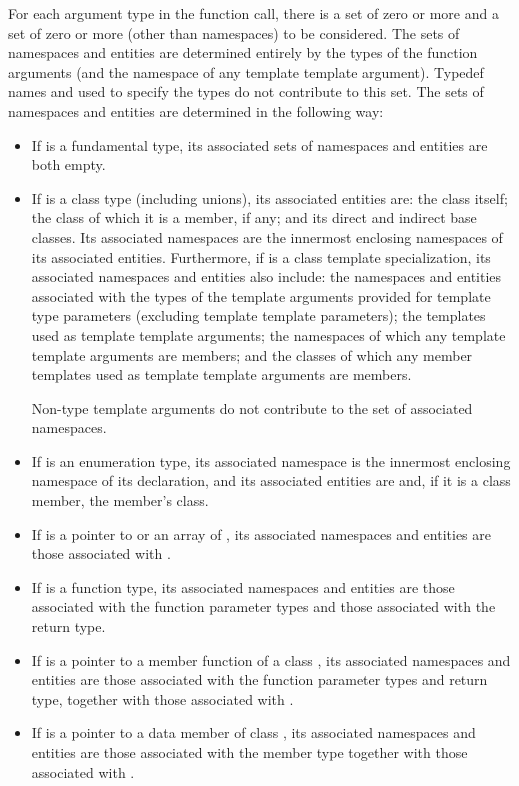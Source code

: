 \pnum
For each argument type  in the function call,
there is a set of zero or more
and a set of zero or more
(other than namespaces)
to be considered.
The sets of namespaces and entities
are determined entirely by
the types of the function arguments
(and the namespace of any template template argument).
Typedef names and 
used to specify the types
do not contribute to this set.
The sets of namespaces and entities
are determined in the following way:
\begin{itemize}
\item If  is a fundamental type, its associated sets of
namespaces and entities are both empty.

\item If  is a class type (including unions),
its associated entities are:
the class itself;
the class of which it is a member, if any;
and its direct and indirect base classes.
Its associated namespaces are
the innermost enclosing namespaces of its associated entities.
Furthermore, if  is a class template specialization,
its associated namespaces and entities also include:
the namespaces and entities
associated with the types of the template arguments
provided for template type parameters
(excluding template template parameters);
the templates used as template template arguments;
the namespaces of which any template template arguments are members; and the
classes of which any member templates used as template template
arguments are members.
\begin{note}
Non-type template arguments do not
contribute to the set of associated namespaces.
\end{note}

\item If  is an enumeration type,
its associated namespace is
the innermost enclosing namespace of its declaration, and
its associated entities are 
and, if it is a class member, the member's class.

\item If  is a pointer to  or an array of ,
its associated namespaces and entities are those associated with
.

\item If  is a function type, its associated namespaces and
entities are those associated with the function parameter types and those
associated with the return type.

\item If  is a pointer to a member function of a class
, its associated namespaces and entities are those associated
with the function parameter types and return type, together with those
associated with .

\item If  is a pointer to a data member of class , its
associated namespaces and entities are those associated with the member
type together with those associated with .
\end{itemize}
